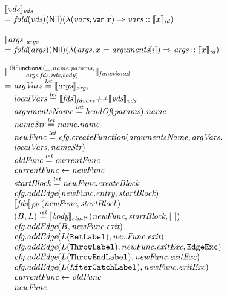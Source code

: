 \[\begin{array}{l@{}l@{~}l}
\lefteqn{\transfun{\emph{vds}}_{\emph{vds}}}\\
 & = &
\fold(\emph{vds})(\Nil)(\lambda(\emph{vars}, \irvar{x})\Rightarrow \emph{vars} :: \transfun{x}_{\emph{id}})\\
& & \\

\lefteqn{\transfun{\emph{args}}_{\emph{args}}}\\
 & = &
\fold(\emph{args})(\Nil)(\lambda(\emph{args}, x = \emph{arguments}[i]) \Rightarrow \emph{args} :: \transfun{x}_{\emph{id}})\\
& & \\
\lefteqn{\transfun{\irfunctionalsmall{\_}{\emph{name}}{\emph{params}}{\emph{args}}{\emph{fds}}{\emph{vds}}{\emph{body}}}_{\emph{functional}}}\\
& = & \emph{argVars} \letval \transfun{\emph{args}}_{\emph{args}}\\
& & \emph{localVars} \letval \transfun{\emph{fds}}_{\emph{fdvars}} \emph{++} \transfun{\emph{vds}}_{\emph{vds}}\\
& & \emph{argumentsName} \letval \headOf(\emph{params}).\emph{name}\\
& & \emph{nameStr} \letval \emph{name}.\emph{name}\\
& & \emph{newFunc} \letval \emph{cfg}.\emph{createFunction}(\emph{argumentsName}, \emph{argVars},\\
& & \emph{localVars}, \emph{nameStr})\\
& & \emph{oldFunc} \letval \emph{currentFunc}\\
& & \emph{currentFunc} \leftarrow \emph{newFunc}\\
& & \emph{startBlock} \letval \emph{newFunc}.\emph{createBlock}\\
& & \emph{cfg}.\emph{addEdge}(\emph{newFunc}.\emph{entry}, \emph{startBlock})\\
& & \transfun{\emph{fds}}_{\emph{fd}^{*}}(\emph{newFunc}, \emph{startBlock})\\
& & (B, L) \letval \transfun{\emph{body}}_{\emph{stmt}^{*}}(\emph{newFunc}, \emph{startBlock}, [\ ])\\
& & \emph{cfg}.\emph{addEdge}(B, \emph{newFunc}.\emph{exit})\\
& & \emph{cfg}.\emph{addEdge}(L(\TT{RetLabel}), \emph{newFunc}.\emph{exit})\\
& & \emph{cfg}.\emph{addEdge}(L(\TT{ThrowLabel}), \emph{newFunc}.\emph{exitExc}, \EdgeExc)\\
& & \emph{cfg}.\emph{addEdge}(L(\TT{ThrowEndLabel}), \emph{newFunc}.\emph{exitExc})\\
& & \emph{cfg}.\emph{addEdge}(L(\TT{AfterCatchLabel}), \emph{newFunc}.\emph{exitExc})\\
& & \emph{currentFunc} \leftarrow \emph{oldFunc}\\
& & \emph{newFunc}\\
& & \\


\end{array}\]
